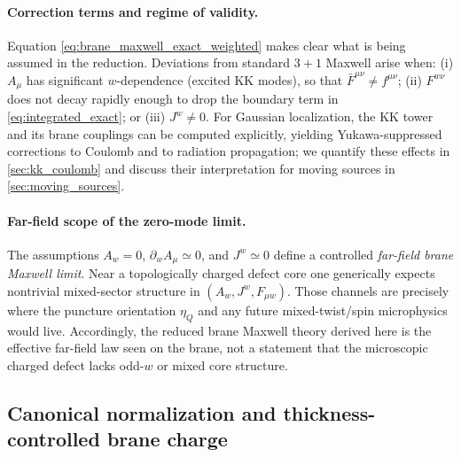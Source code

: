 \documentclass[11pt]{article}
\newcommand{\A}{A}
\newcommand{\F}{F}
\newcommand{\J}{J}
\newcommand{\etaQ}{\eta_Q}
\begin{document}
\paragraph{Correction terms and regime of validity.}
Equation \cref{eq:brane_maxwell_exact_weighted} makes clear what is being assumed
in the reduction. Deviations from standard \(3+1\) Maxwell arise when:
(i) \(\A_\mu\) has significant \(w\)-dependence (excited KK modes), so that
\(\bar{\F}^{\mu\nu}\neq f^{\mu\nu}\);
(ii) \(\F^{w\nu}\) does not decay rapidly enough to drop the boundary term in
\cref{eq:integrated_exact}; or (iii) \(\J^w\neq 0\).
For Gaussian localization, the KK tower and its brane couplings can be computed
explicitly, yielding Yukawa-suppressed corrections to Coulomb and to radiation
propagation; we quantify these effects in \cref{sec:kk_coulomb} and discuss their
interpretation for moving sources in \cref{sec:moving_sources}.

\paragraph{Far-field scope of the zero-mode limit.}
The assumptions \(\A_w=0\), \(\partial_w\A_\mu\simeq 0\), and \(\J^w\simeq 0\)
define a controlled \emph{far-field brane Maxwell limit}. Near a topologically
charged defect core one generically expects nontrivial mixed-sector structure in
\((A_w,J^w,F_{\mu w})\). Those channels are precisely where the puncture
orientation \(\etaQ\) and any future mixed-twist/spin microphysics would live.
Accordingly, the reduced brane Maxwell theory derived here is the effective
far-field law seen on the brane, not a statement that the microscopic charged
defect lacks odd-\(w\) or mixed core structure.

\subsection{Canonical normalization and thickness-controlled brane charge}
\label{sec:canonical_charge}
\end{document}
